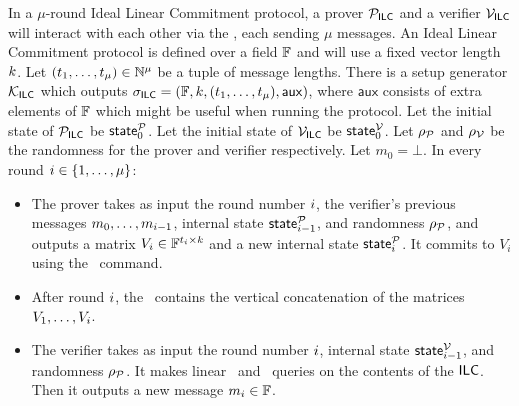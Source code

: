 In a $\mu$-round Ideal Linear Commitment protocol, a prover $\mathcal{P}_{\mathsf{ILC}}$ and a verifier $\mathcal{V}_{\mathsf{ILC}}$ will interact with each other via the \ILC, each sending $\mu$ messages. An Ideal Linear Commitment protocol is defined over a field $\mathbb{F}$ and will use a fixed vector length $k$. Let $(t_1,\ldots,t_\mu) \in \mathbb{N}^\mu$ be a tuple of message lengths. There is a setup generator $\mathcal{K}_{\mathsf{ILC}}$ which outputs $\mathsf{\sigma}_{\mathsf{ILC}} = (\mathbb{F},k,(t_1,\ldots,t_\mu),\mathsf{aux})$, where $\mathsf{aux}$ consists of extra elements of $\mathbb{F}$ which might be useful when running the protocol. Let the initial state of $\mathcal{P}_{\mathsf{ILC}}$ be $\mathsf{state}^{\mathcal{P}}_0$. Let the initial state of $\mathcal{V}_{\mathsf{ILC}}$ be $\mathsf{state}^{\mathcal{V}}_0$. Let $\rho_{\mathcal{P}}$ and $\rho_{\mathcal{V}}$ be the randomness for the prover and verifier respectively. Let $m_0 = \bot$. In every round $i \in \{ 1,\ldots,\mu \}$:
\begin{itemize}
\item The prover takes as input the round number $i$, the verifier's previous messages $m_0,\ldots,m_{i-1}$, internal state $\mathsf{state}^{\mathcal{P}}_{i-1}$, and randomness $\rho_{\mathcal{P}}$, and outputs a matrix $V_i \in \mathbb{F}^{t_i \times k}$ and a new internal state $\mathsf{state}^{\mathcal{P}}_{i}$. It commits to $V_i$ using the \ILCcommit\ command.
\item After round $i$, the \ILC \ contains the vertical concatenation of the matrices $V_1,\ldots,V_i$.
\item The verifier takes as input the round number $i$, internal state $\mathsf{state}^{\mathcal{V}}_{i-1}$, and randomness $\rho_{\mathcal{P}}$. It makes linear \ILCopen\ and \ILCcheck\ queries on the contents of the $\mathsf{ILC}$. Then it outputs a new message $m_i \in \mathbb{F}$.
\end{itemize}

